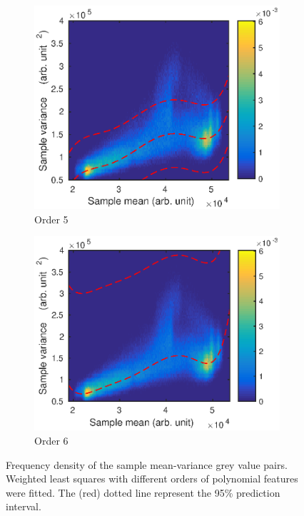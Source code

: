 \documentclass[12pt]{report}
\begin{document}
\begin{figure}
\begin{subfigure}{0.45\textwidth}
		\includegraphics[width=\textwidth]{figures/meanVar/order5.eps}
		\caption{Order 5}
	\end{subfigure}
	\begin{subfigure}{0.45\textwidth}
		\includegraphics[width=\textwidth]{figures/meanVar/order6.eps}
		\caption{Order 6}
	\end{subfigure}
	\caption{Frequency density of the sample mean-variance grey value pairs. Weighted least squares with different orders of polynomial features were fitted. The (red) dotted line represent the 95\% prediction interval.}
	\label{fig:weightedLS_polynomials}
\end{figure}
\end{document}

